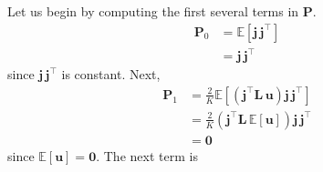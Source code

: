 \documentclass[modern]{aastex62}
\begin{document}
    Let us begin by computing the first several terms in $\mathbf{P}$.
    \begin{align}
        \mathbf{P}_0 & = \mathbb{E}\left[ \mathbf{j} \, \mathbf{j}^\top \right]
        \nonumber                                                               \\
                     & = \mathbf{j} \, \mathbf{j}^\top
    \end{align}
    since $\mathbf{j} \, \mathbf{j}^\top$ is constant. Next,
    \begin{align}
        \mathbf{P}_1 & = \frac{2}{K}\mathbb{E}\left[ \left(\mathbf{j}^\top \mathbf{L} \, \mathbf{u}\right) \mathbf{j} \, \mathbf{j}^\top \right]
        \nonumber                                                                                                                                \\
                     & = \frac{2}{K}\left(\mathbf{j}^\top \mathbf{L} \, \mathbb{E}\left[ \mathbf{u} \right]\right) \mathbf{j} \, \mathbf{j}^\top
        \nonumber                                                                                                                                \\
                     & = \mathbf{0}
    \end{align}
    since $\mathbb{E}\left[ \mathbf{u} \right] = \mathbf{0}$. The next term is
\end{document}
